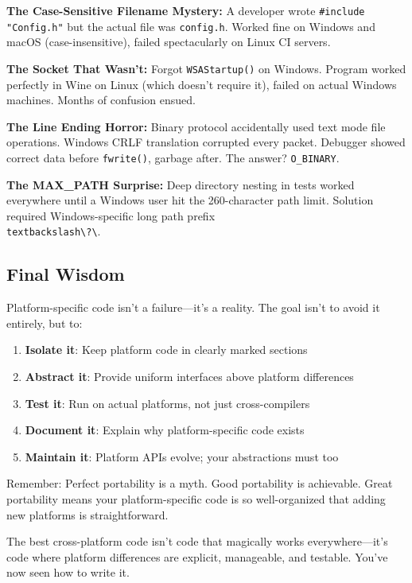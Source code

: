 \textbf{The Case-Sensitive Filename Mystery:}
A developer wrote \texttt{\#include "Config.h"} but the actual file was \texttt{config.h}. Worked fine on Windows and macOS (case-insensitive), failed spectacularly on Linux CI servers.

\textbf{The Socket That Wasn't:}
Forgot \texttt{WSAStartup()} on Windows. Program worked perfectly in Wine on Linux (which doesn't require it), failed on actual Windows machines. Months of confusion ensued.

\textbf{The Line Ending Horror:}
Binary protocol accidentally used text mode file operations. Windows CRLF translation corrupted every packet. Debugger showed correct data before \texttt{fwrite()}, garbage after. The answer? \texttt{O\_BINARY}.

\textbf{The MAX\_PATH Surprise:}
Deep directory nesting in tests worked everywhere until a Windows user hit the 260-character path limit. Solution required Windows-specific long path prefix \texttt{\\textbackslash\textbackslash?\textbackslash}.

\subsection{Final Wisdom}

Platform-specific code isn't a failure---it's a reality. The goal isn't to avoid it entirely, but to:

\begin{enumerate}
    \item \textbf{Isolate it}: Keep platform code in clearly marked sections
    \item \textbf{Abstract it}: Provide uniform interfaces above platform differences
    \item \textbf{Test it}: Run on actual platforms, not just cross-compilers
    \item \textbf{Document it}: Explain why platform-specific code exists
    \item \textbf{Maintain it}: Platform APIs evolve; your abstractions must too
\end{enumerate}

Remember: Perfect portability is a myth. Good portability is achievable. Great portability means your platform-specific code is so well-organized that adding new platforms is straightforward.

The best cross-platform code isn't code that magically works everywhere---it's code where platform differences are explicit, manageable, and testable. You've now seen how to write it.

